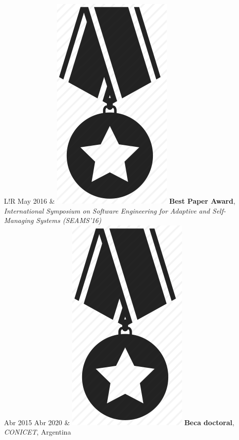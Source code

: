 \documentclass[10pt]{article}
\newcommand\VRule{\color{lightgray}\vrule width 0.5pt}
\begin{document}
\begin{tabular}{L!{\VRule}R}
May 2016 & \includegraphics[scale=0.022]{../img/medal.png} 
\textbf{Best Paper Award}, 
\textit{International Symposium on Software Engineering for Adaptive and
Self-Managing Systems (SEAMS'16)}\\

Abr 2015 Abr 2020 & \includegraphics[scale=0.022]{../img/medal.png} 
\textbf{Beca doctoral}, \textit{CONICET}, Argentina\\


\end{tabular}
\end{document}
